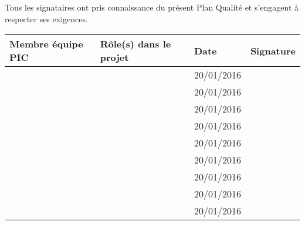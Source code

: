 Tous les signataires ont pris connaissance du présent Plan Qualité et s'engagent à respecter ses exigences. \\
	
	\vspace{1cm}

\begin{tabular}[h]{|p{}|p{}|p{}|p{}|}
	\hline
	
	Membre équipe PIC & Rôle(s) dans le projet & Date & Signature \\\hline
	\Sergi & \CP & 20/01/2016 &  \\\hline
	\Pierre & \RQ \newline \CPA & 20/01/2016 &  \\\hline
	\Michel & \D \newline \RD & 20/01/2016 &  \\\hline
	\Kafui & \D \newline \RQA & 20/01/2016 &  \\\hline
	\Matthieu & \D \newline \RRS & 20/01/2016 &  \\\hline
	\Mathieu & \D \newline \RGC & 20/01/2016 &  \\\hline
	\Melissa & \D & 20/01/2016 &  \\\hline
	\Julie & \D & 20/01/2016 &  \\\hline
	\Florian & \D & 20/01/2016 &  \\\hline
\end{tabular}
